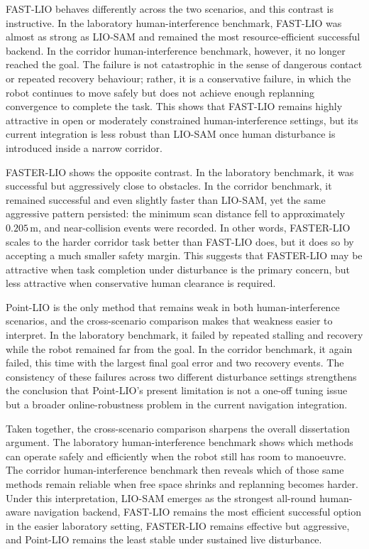 \documentclass[12pt,a4paper]{report}
\begin{document}
FAST-LIO behaves differently across the two scenarios, and this contrast is instructive. In the laboratory human-interference benchmark, FAST-LIO was almost as strong as LIO-SAM and remained the most resource-efficient successful backend. In the corridor human-interference benchmark, however, it no longer reached the goal. The failure is not catastrophic in the sense of dangerous contact or repeated recovery behaviour; rather, it is a conservative failure, in which the robot continues to move safely but does not achieve enough replanning convergence to complete the task. This shows that FAST-LIO remains highly attractive in open or moderately constrained human-interference settings, but its current integration is less robust than LIO-SAM once human disturbance is introduced inside a narrow corridor.

FASTER-LIO shows the opposite contrast. In the laboratory benchmark, it was successful but aggressively close to obstacles. In the corridor benchmark, it remained successful and even slightly faster than LIO-SAM, yet the same aggressive pattern persisted: the minimum scan distance fell to approximately \(0.205\,\mathrm{m}\), and near-collision events were recorded. In other words, FASTER-LIO scales to the harder corridor task better than FAST-LIO does, but it does so by accepting a much smaller safety margin. This suggests that FASTER-LIO may be attractive when task completion under disturbance is the primary concern, but less attractive when conservative human clearance is required.

Point-LIO is the only method that remains weak in both human-interference scenarios, and the cross-scenario comparison makes that weakness easier to interpret. In the laboratory benchmark, it failed by repeated stalling and recovery while the robot remained far from the goal. In the corridor benchmark, it again failed, this time with the largest final goal error and two recovery events. The consistency of these failures across two different disturbance settings strengthens the conclusion that Point-LIO's present limitation is not a one-off tuning issue but a broader online-robustness problem in the current navigation integration.

Taken together, the cross-scenario comparison sharpens the overall dissertation argument. The laboratory human-interference benchmark shows which methods can operate safely and efficiently when the robot still has room to manoeuvre. The corridor human-interference benchmark then reveals which of those same methods remain reliable when free space shrinks and replanning becomes harder. Under this interpretation, LIO-SAM emerges as the strongest all-round human-aware navigation backend, FAST-LIO remains the most efficient successful option in the easier laboratory setting, FASTER-LIO remains effective but aggressive, and Point-LIO remains the least stable under sustained live disturbance.
\end{document}

